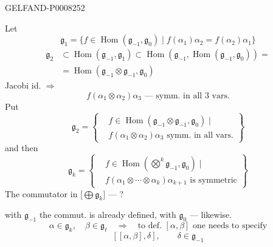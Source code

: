 \begin{GelfandAdjacentEvidence}{GELFAND-P000825}{2}


Let
\begin{equation*}
\mathfrak g_1=\{f\in\operatorname{Hom}(\mathfrak g_{-1},\mathfrak g_0)
\mid f(\alpha_1)\alpha_2=f(\alpha_2)\alpha_1\}\tag{9}
\end{equation*}
\begin{equation*}
\begin{aligned}
\mathfrak g_2 &\subset\operatorname{Hom}(\mathfrak g_{-1},\mathfrak g_1)
\subset\operatorname{Hom}(\mathfrak g_{-1},\operatorname{Hom}(\mathfrak g_{-1},\mathfrak g_0))=\\
&=\operatorname{Hom}(\mathfrak g_{-1}\otimes\mathfrak g_{-1},\mathfrak g_0)
\end{aligned}\tag{10}
\end{equation*}
Jacobi id. \(\Rightarrow\)
\begin{equation*}
f(\alpha_1\otimes\alpha_2)\alpha_3\text{ — symm. in all 3 vars.}\tag{11}
\end{equation*}
Put
\begin{equation*}
\mathfrak g_2=\left\{\begin{aligned}
&f\in\operatorname{Hom}(\mathfrak g_{-1}\otimes\mathfrak g_{-1},\mathfrak g_0)\mid\\
&f(\alpha_1\otimes\alpha_2)\alpha_3\text{ symm. in all vars.}
\end{aligned}\right\}\tag{12}
\end{equation*}
and then
\begin{equation*}
\mathfrak g_k=\left\{\begin{aligned}
&f\in\operatorname{Hom}(\overset{k}{\bigotimes}\mathfrak g_{-1},\mathfrak g_0)\mid\\
&f(\alpha_1\otimes\cdots\otimes\alpha_k)\alpha_{k+1}\text{ is symmetric}
\end{aligned}\right\}\tag{13}
\end{equation*}
The commutator in \(\bigl[\bigoplus \mathfrak g_k\bigr]\) — ?

with \(\mathfrak g_{-1}\) the commut. is already defined, with \(\mathfrak g_0\) — likewise.
\[
\alpha\in\mathfrak g_k,\quad \beta\in\mathfrak g_\ell\quad\Rightarrow\quad
\text{to def. }[\alpha,\beta]\text{ one needs to specify}
\]
\[
[[\alpha,\beta],\delta],\qquad\delta\in\mathfrak g_{-1}
\]
\end{GelfandAdjacentEvidence}
